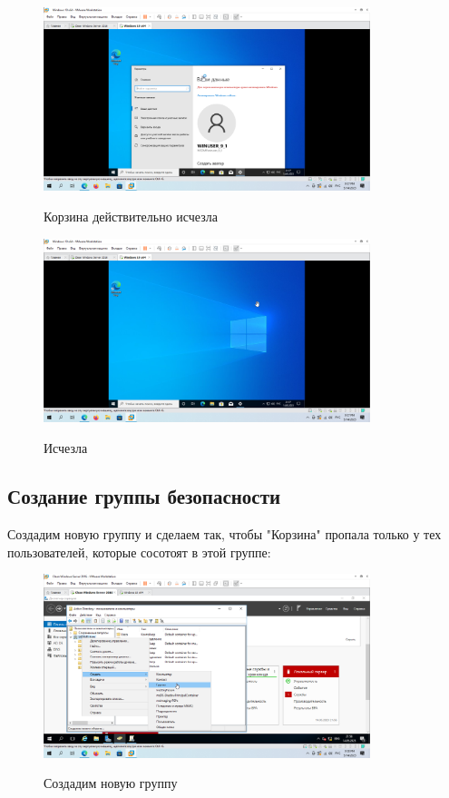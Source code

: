 \documentclass[a4paper]{article}
\begin{document}
  \begin{figure}[H]
    \centering
    \includegraphics[width=0.85\textwidth]{5_0152}
    \label{img:152}
    \caption{Корзина действительно исчезла}
  \end{figure}

  \begin{figure}[H]
    \centering
    \includegraphics[width=0.85\textwidth]{5_0153}
    \label{img:153}
    \caption{Исчезла}
  \end{figure}

  \subsection{Создание группы безопасности}

  Создадим новую группу и сделаем так, чтобы "Корзина" пропала только у тех
  пользователей, которые сосотоят в этой группе:

  \begin{figure}[H]
    \centering
    \includegraphics[width=0.85\textwidth]{5_0154}
    \label{img:154}
    \caption{Создадим новую группу}
  \end{figure}
\end{document}
